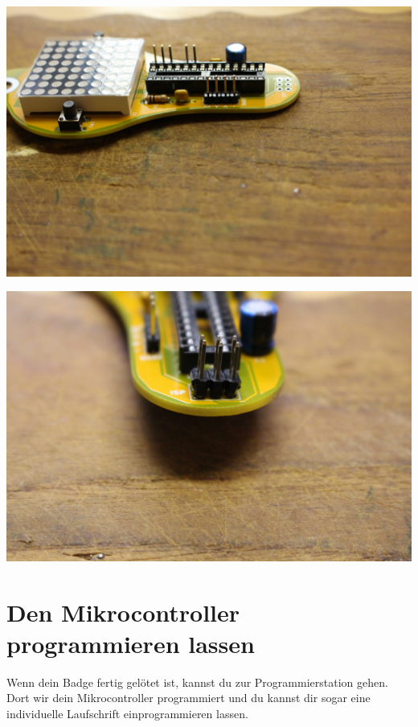 \documentclass{article}
\begin{document}
\begin{minipage}[b]{0.5\textwidth}
	\includegraphics[width=\textwidth]{Bilder/IMG_5612.JPG}
	\label{fig:}
\end{minipage}
\begin{minipage}[b]{0.5\textwidth}
	\includegraphics[width=\textwidth]{Bilder/IMG_5616.JPG}
	\label{fig:}
\end{minipage}

\section{Den Mikrocontroller programmieren lassen}

Wenn dein Badge fertig gelötet ist, kannst du zur Programmierstation gehen. Dort wir dein Mikrocontroller programmiert und du kannst dir sogar eine individuelle Laufschrift einprogrammieren lassen.
\end{document}

